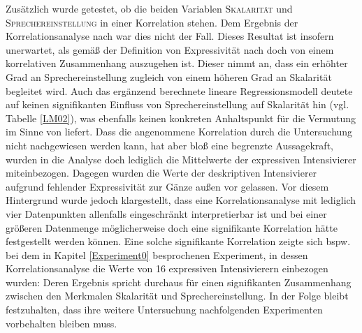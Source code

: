 Zusätzlich wurde getestet, ob die beiden Variablen \textsc{Skalarität} und \textsc{Sprechereinstellung} in einer Korrelation stehen. Dem Ergebnis der Korrelationsanalyse nach war dies nicht der Fall. Dieses Resultat ist insofern unerwartet, als gemäß der Definition von Expressivität nach \citet[133]{Gutzmann.2019a} doch von einem korrelativen Zusammenhang auszugehen ist. Dieser nimmt an, dass ein erhöhter Grad an Sprechereinstellung zugleich von einem höheren Grad an Skalarität begleitet wird. Auch das ergänzend berechnete lineare Regressionsmodell deutete auf keinen signifikanten Einfluss von Sprechereinstellung auf Skalarität hin (vgl. Tabelle \ref{LM02}), was ebenfalls keinen konkreten Anhaltspunkt für die Vermutung im Sinne von \citet[133]{Gutzmann.2019a} liefert. Dass die angenommene Korrelation durch die Untersuchung nicht nachgewiesen werden kann, hat aber bloß eine begrenzte Aussagekraft, wurden in die Analyse doch lediglich die Mittelwerte der expressiven Intensivierer miteinbezogen. Dagegen wurden die Werte der deskriptiven Intensivierer aufgrund fehlender Expressivität zur Gänze außen vor gelassen. Vor diesem Hintergrund wurde jedoch klargestellt, dass eine Korrelationsanalyse mit lediglich vier Datenpunkten allenfalls eingeschränkt interpretierbar ist und bei einer größeren Datenmenge möglicherweise doch eine signifikante Korrelation hätte festgestellt werden können. Eine solche signifikante Korrelation zeigte sich bspw. bei dem in Kapitel \ref{Experiment0} besprochenen Experiment, in dessen Korrelationsanalyse die Werte von 16 expressiven Intensivierern einbezogen wurden: Deren Ergebnis spricht durchaus für einen signifikanten Zusammenhang zwischen den Merkmalen Skalarität und Sprechereinstellung. In der Folge bleibt festzuhalten, dass ihre weitere Untersuchung nachfolgenden Experimenten vorbehalten bleiben muss.


